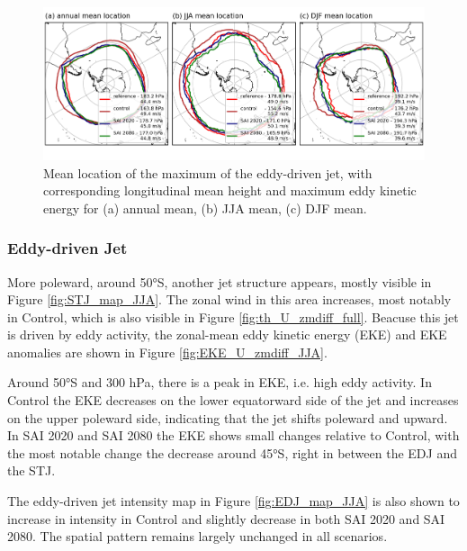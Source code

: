 \begin{figure}[H]
	\centering
	\includegraphics[width=0.95\linewidth]{images/STJ_maxloc.png}
	\caption{Mean location of the maximum of the eddy-driven jet, with corresponding longitudinal mean height and maximum eddy kinetic energy for (a) annual mean, (b) JJA mean, (c) DJF mean.}
	\label{fig:STJ_maxloc}
\end{figure}


\subsubsection{Eddy-driven Jet}\label{EDJ_sec}
More poleward, around 50°S, another jet structure appears, mostly visible in Figure \ref{fig:STJ_map_JJA}. The zonal wind in this area increases, most notably in Control, which is also visible in Figure \ref{fig:th_U_zmdiff_full}. Beacuse this jet is driven by eddy activity, the zonal-mean eddy kinetic energy (EKE) and EKE anomalies are shown in Figure \ref{fig:EKE_U_zmdiff_JJA}.

Around 50°S and 300 hPa, there is a peak in EKE, i.e. high eddy activity. In Control the EKE decreases on the lower equatorward side of the jet and increases on the upper poleward side, indicating that the jet shifts poleward and upward. In SAI 2020 and SAI 2080 the EKE shows small changes relative to Control, with the most notable change the decrease around 45°S, right in between the EDJ and the STJ. 

The eddy-driven jet intensity map in Figure \ref{fig:EDJ_map_JJA} is also shown to increase in intensity in Control and slightly decrease in both SAI 2020 and SAI 2080. The spatial pattern remains largely unchanged in all scenarios. 


